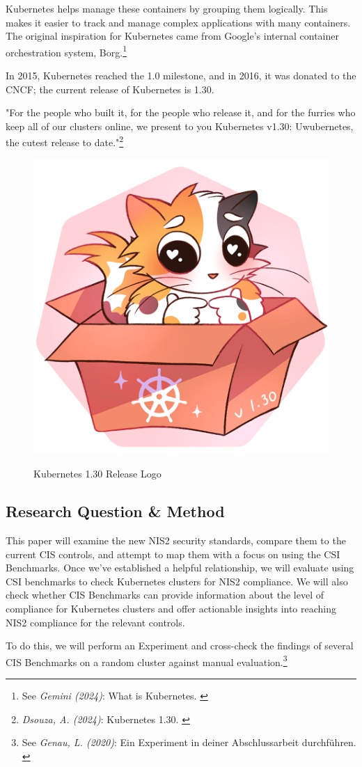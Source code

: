 Kubernetes helps manage these containers by grouping them logically. This makes it easier to track and manage complex applications with many containers. The original inspiration for Kubernetes came from Google's internal container orchestration system, Borg.\footnote{See \textit{Gemini (2024)}: What is Kubernetes. \cite{bardKubernetes}} 

In 2015, Kubernetes reached the 1.0 milestone, and in 2016, it was donated to the CNCF; the current release of Kubernetes is 1.30.

"For the people who built it, for the people who release it, and for the furries who keep all of our clusters online, we present to you Kubernetes v1.30: Uwubernetes, the cutest release to date."\footnote{\textit{Dsouza, A. (2024)}: Kubernetes 1.30. \cite{uwubernetes}}

\begin{figure}[H]
\centering
\caption {Kubernetes 1.30 Release Logo}
\includegraphics[width=0.3\linewidth]{images/k8s-1.30.png}
\label{fig:uwubernetes}
\end{figure}

\subsection{Research Question \& Method}

This paper will examine the new NIS2 security standards, compare them to the current CIS controls, and attempt to map them with a focus on using the CSI Benchmarks. Once we've established a helpful relationship, we will evaluate using CSI benchmarks to check Kubernetes clusters for NIS2 compliance. We will also check whether CIS Benchmarks can provide information about the level of compliance for Kubernetes clusters and offer actionable insights into reaching NIS2 compliance for the relevant controls.

To do this, we will perform an Experiment and cross-check the findings of several CIS Benchmarks on a random cluster against manual evaluation.\footnote{See \textit{Genau, L. (2020)}: Ein Experiment in deiner Abschlussarbeit durchführen. \cite{expScribbr}}

